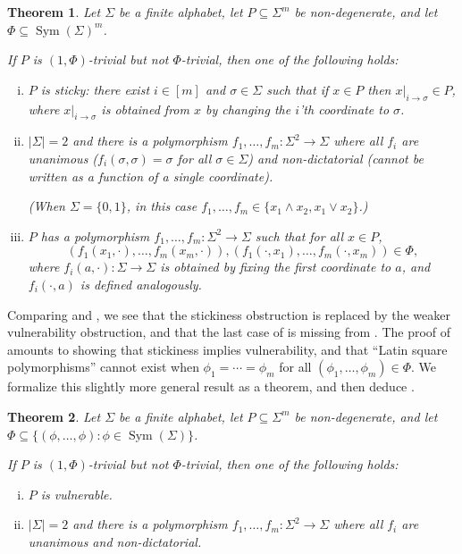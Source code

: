 \documentclass{article}
\DeclareMathOperator{\Sym}{Sym}
\newtheorem{theorem}{Theorem}[section]
\theoremstyle{definition}
\theoremstyle{remark}
\begin{document}
\begin{theorem}
\label{thm:filmus-paper}
Let $\Sigma$ be a finite alphabet, let $P \subseteq \Sigma^m$ be non-degenerate, and let $\Phi \subseteq \Sym(\Sigma)^m$.

If $P$ is $(1,\Phi)$-trivial but not $\Phi$-trivial, then one of the following holds:
\begin{enumerate}[(i)]
\item $P$ is \emph{sticky}: there exist $i \in [m]$ and $\sigma \in \Sigma$ such that if $x \in P$ then $x|_{i \to \sigma} \in P$, where $x|_{i \to \sigma}$ is obtained from $x$ by changing the $i$'th coordinate to $\sigma$. \label{itm:sticky}
\item $|\Sigma| = 2$ and there is a polymorphism $f_1,\ldots,f_m\colon \Sigma^2 \to \Sigma$ where all $f_i$ are unanimous ($f_i(\sigma,\sigma) = \sigma$ for all $\sigma \in \Sigma$) and non-dictatorial (cannot be written as a function of a single coordinate).

(When $\Sigma = \{0,1\}$, in this case $f_1,\ldots,f_m \in \{x_1 \land x_2, x_1 \lor x_2\}$.)
\label{itm:and-or}
\item $P$ has a polymorphism $f_1,\dots,f_m\colon \Sigma^2 \to \Sigma$ such that for all $x \in P$,
\[
 (f_1(x_1,\cdot),\dots,f_m(x_m,\cdot)),
 (f_1(\cdot,x_1),\dots,f_m(\cdot,x_m)) \in \Phi,
\]
where $f_i(a,\cdot)\colon \Sigma \to \Sigma$ is obtained by fixing the first coordinate to $a$, and $f_i(\cdot,a)$ is defined analogously.
\label{itm:latin-square}
\end{enumerate}
\end{theorem}

Comparing  and , we see that the stickiness obstruction is replaced by the weaker vulnerability obstruction, and that the last case of  is missing from . The proof of  amounts to showing that stickiness implies vulnerability, and that ``Latin square polymorphisms'' cannot exist when $\phi_1 = \cdots = \phi_m$ for all $(\phi_1,\dots,\phi_m) \in \Phi$. We formalize this slightly more general result as a theorem, and then deduce .

\begin{theorem}
\label{thm:filmus-identical}
Let $\Sigma$ be a finite alphabet, let $P \subseteq \Sigma^m$ be non-degenerate, and let $\Phi \subseteq \{(\phi,\dots,\phi) : \phi \in \Sym(\Sigma)\}$.

If $P$ is $(1,\Phi)$-trivial but not $\Phi$-trivial, then one of the following holds:
\begin{enumerate}[(i)]
\item $P$ is vulnerable.
\item $|\Sigma| = 2$ and there is a polymorphism $f_1,\dots,f_m\colon \Sigma^2 \to \Sigma$ where all $f_i$ are unanimous and non-dictatorial.
\end{enumerate}
\end{theorem}
\end{document}
